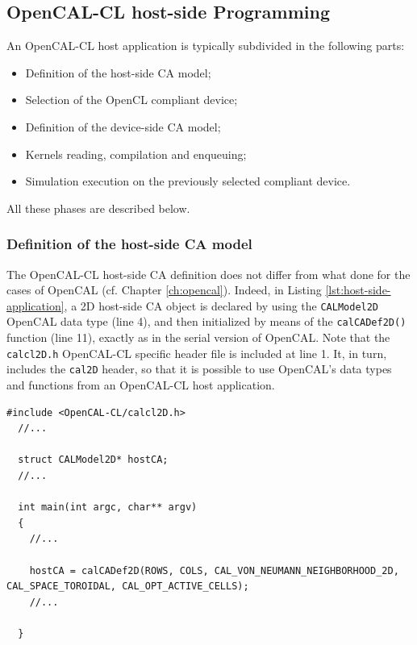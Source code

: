 \subsection{OpenCAL-CL host-side Programming}

An OpenCAL-CL host application is typically
subdivided in the following parts:
\begin{itemize}
\item Definition of the host-side CA model;
\item Selection of the OpenCL compliant device;
\item Definition of the device-side CA model;
\item Kernels reading, compilation and enqueuing;
\item Simulation execution on the previously selected compliant
  device.
\end{itemize}

All these phases are described below.

\subsubsection{Definition of the host-side CA model}

The OpenCAL-CL host-side CA definition does not differ from what done
for the cases of OpenCAL (cf. Chapter \ref{ch:opencal}). Indeed, in
Listing \ref{lst:host-side-application}, a 2D host-side CA object is
declared by using the \verb'CALModel2D' OpenCAL data type (line 4),
and then initialized by means of the \verb'calCADef2D()' function
(line 11), exactly as in the serial version of OpenCAL. Note that the
\verb'calcl2D.h' OpenCAL-CL specific header file is included at line
1. It, in turn, includes the \verb'cal2D' header, so that it is
possible to use OpenCAL's data types and functions from an OpenCAL-CL
host application.

\begin{lstlisting}[float,floatplacement=H, label=lst:host-side-application, caption={An example of OpenCAL-CL host-side application.}] 
  #include <OpenCAL-CL/calcl2D.h>
  //...

  struct CALModel2D* hostCA;
  //...
  
  int main(int argc, char** argv)
  {
    //...

    hostCA = calCADef2D(ROWS, COLS, CAL_VON_NEUMANN_NEIGHBORHOOD_2D, CAL_SPACE_TOROIDAL, CAL_OPT_ACTIVE_CELLS);
    //...
        
  }
\end{lstlisting}


